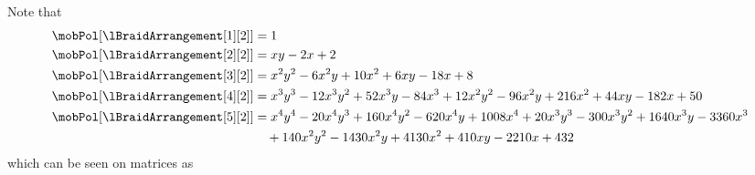 Note that
\begin{align*}
\mobPol[{\lBraidArrangement[1][2]}] & = 1 \\
\mobPol[{\lBraidArrangement[2][2]}] & = x y - 2 x + 2 \\
\mobPol[{\lBraidArrangement[3][2]}] & = x^2 y^2 - 6 x^2 y + 10 x^2 + 6 x y - 18 x + 8 \\
\mobPol[{\lBraidArrangement[4][2]}] & = x^3 y^3 - 12 x^3 y^2 + 52 x^3 y - 84 x^3 + 12 x^2 y^2 - 96 x^2 y + 216 x^2 + 44 x y - 182 x + 50 \\
\mobPol[{\lBraidArrangement[5][2]}] & = x^4 y^4 - 20 x^4 y^3 + 160 x^4 y^2 - 620 x^4 y + 1008 x^4 + 20 x^3 y^3 - 300 x^3 y^2 + 1640 x^3 y - 3360 x^3 \\ & \quad+ 140 x^2 y^2 - 1430 x^2 y + 4130 x^2 + 410 x y - 2210 x + 432
\end{align*}
which can be seen on matrices as

